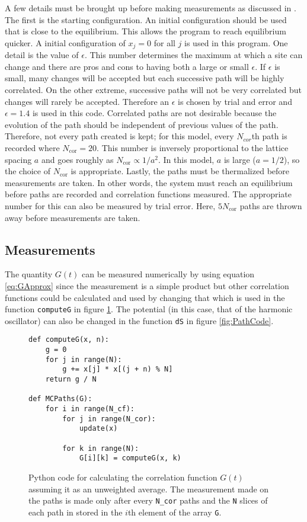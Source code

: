 \documentclass[11pt]{article}
\begin{document}
A few details must be brought up before making measurements as discussed in \cite{MainPaper}. The first is the starting configuration. An initial configuration should be used that is close to the equilibrium. This allows the program to reach equilibrium quicker. A initial configuration of $x_j=0$ for all $j$ is used in this program. One detail is the value of $\epsilon$. This number determines the maximum at which a site can change and there are pros and cons to having both a large or small $\epsilon$. If $\epsilon$ is small, many changes will be accepted but each successive path will be highly correlated. On the other extreme, successive paths will not be very correlated but changes will rarely be accepted. Therefore an $\epsilon$ is chosen by trial and error and $\epsilon=1.4$ is used in this code. Correlated paths are not desirable because the evolution of the path should be independent of previous values of the path. Therefore, not every path created is kept; for this model, every $N_{cor}$th path is recorded where $N_{\text{cor}}=20$. This number is inversely proportional to the lattice spacing $a$ and goes roughly as $N_{\text{cor}}\propto 1/a^2$. In this model, $a$ is large ($a=1/2$), so the choice of $N_{\text{cor}}$ is appropriate. Lastly, the paths must be thermalized before measurements are taken. In other words, the system must reach an equilibrium before paths are recorded and correlation functions measured. The appropriate number for this can also be measured by trial error. Here, $5N_{\text{cor}}$ paths are thrown away before measurements are taken.

\subsection{Measurements}
The quantity $G(t)$ can be measured numerically by using equation \ref{eq:GApprox} since the measurement is a simple product but other correlation functions could be calculated  and used by changing that which is used in the function \texttt{computeG} in figure \ref{fig:ComputeG}. The potential (in this case, that of the harmonic oscillator) can also be changed in the function \texttt{dS} in figure \ref{fig:PathCode}.

\begin{figure}
\begin{lstlisting}
def computeG(x, n):
    g = 0
    for j in range(N):
        g += x[j] * x[(j + n) % N]
    return g / N

def MCPaths(G):
    for i in range(N_cf):
        for j in range(N_cor):
            update(x)

        for k in range(N):
            G[i][k] = computeG(x, k)
\end{lstlisting}
\caption{Python code for calculating the correlation function $G(t)$ assuming it as an unweighted average. The measurement made on the paths is made only after every \texttt{N\_cor} paths and the \texttt{N} slices of each path in stored in the $i$th element of the array \texttt{G}.}
\label{fig:ComputeG}
\end{figure}
\end{document}
